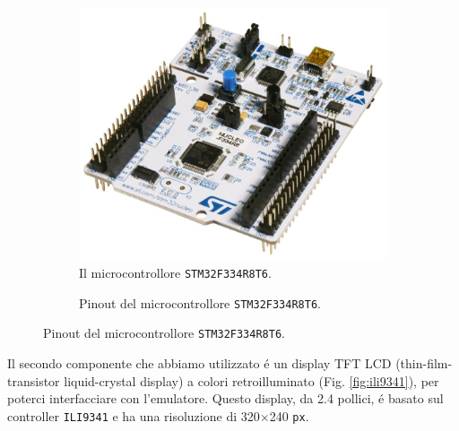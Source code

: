\documentclass[a4paper]{article}
\begin{document}
\begin{figure}[h]
    \begin{subfigure}[b]{0.45\textwidth}
        \begin{center}
            \includegraphics[scale=0.15]{figures/stm32f334.jpg}
        \end{center}
        \caption{Il microcontrollore \texttt{STM32F334R8T6}.}
        \label{fig:stm32f334}
    \end{subfigure}
    \hfill
    \begin{subfigure}[b]{0.45\textwidth}
        \begin{center}
            \begin{tikzpicture}[x=0.015cm, y=0.015cm, scale=0.50, transform shape]
                
            \end{tikzpicture}
        \end{center}
        \caption{Pinout del microcontrollore \texttt{STM32F334R8T6}.}
        \label{fig:pinout_stm32}
    \end{subfigure}
\end{figure}

Il secondo componente che abbiamo utilizzato é un display TFT LCD
(thin-film-transistor liquid-crystal display) a colori retroilluminato
(Fig. \ref{fig:ili9341}),
per poterci interfacciare con l'emulatore. Questo display, da 2.4 pollici,
é basato sul controller \texttt{ILI9341} e ha una risoluzione di
320$\times$240 \texttt{px}.
\end{document}
